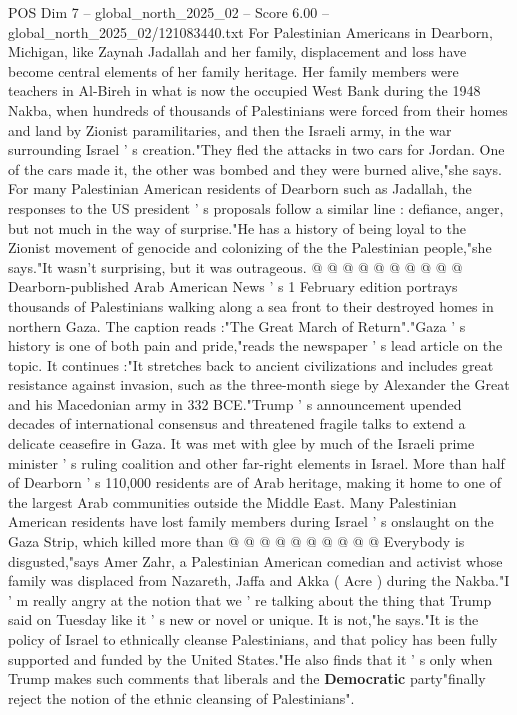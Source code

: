 \begin{textsample}{POS Dim 7 – global\_north\_2025\_02 – Score 6.00 – global\_north\_2025\_02/121083440.txt}  \label{ex:f7_pos_286}
For Palestinian Americans in Dearborn, Michigan, like Zaynah Jadallah and her family, displacement and loss have become central elements of her family heritage.
Her family members were teachers in Al-Bireh in what is now the occupied West Bank during the 1948 Nakba, when hundreds of thousands of Palestinians were forced from their homes and land by Zionist paramilitaries, and then the Israeli army, in the war surrounding Israel ' s creation."They fled the attacks in two cars for Jordan.
One of the cars made it, the other was bombed and they were burned alive,"she says.
For many Palestinian American residents of Dearborn such as Jadallah, the responses to the US president ' s proposals follow a similar line : defiance, anger, but not much in the way of surprise."He has a history of being loyal to the Zionist movement of genocide and colonizing of the the Palestinian people,"she says."It wasn't surprising, but it was outrageous. @ @ @ @ @ @ @ @ @ @ Dearborn-published Arab American News ' s 1 February edition portrays thousands of Palestinians walking along a sea front to their destroyed homes in northern Gaza.
The caption reads :"The Great March of Return"."Gaza ' s history is one of both pain and pride,"reads the newspaper ' s lead article on the topic.
It continues :"It stretches back to ancient civilizations and includes great resistance against invasion, such as the three-month siege by Alexander the Great and his Macedonian army in 332 BCE."Trump ' s announcement upended decades of international consensus and threatened fragile talks to extend a delicate ceasefire in Gaza.
It was met with glee by much of the Israeli prime minister ' s ruling coalition and other far-right elements in Israel.
More than half of Dearborn ' s 110,000 residents are of Arab heritage, making it home to one of the largest Arab communities outside the Middle East.
Many Palestinian American residents have lost family members during Israel ' s onslaught on the Gaza Strip, which killed more than @ @ @ @ @ @ @ @ @ @ Everybody is disgusted,"says Amer Zahr, a Palestinian American comedian and activist whose family was displaced from Nazareth, Jaffa and Akka ( Acre ) during the Nakba."I ' m really angry at the notion that we ' re talking about the thing that Trump said on Tuesday like it ' s new or novel or unique.
It is not,"he says."It is the policy of Israel to ethnically cleanse Palestinians, and that policy has been fully supported and funded by the United States."He also finds that it ' s only when Trump makes such comments that liberals and the \textbf{Democratic} party"finally reject the notion of the ethnic cleansing of Palestinians".

\end{textsample}
